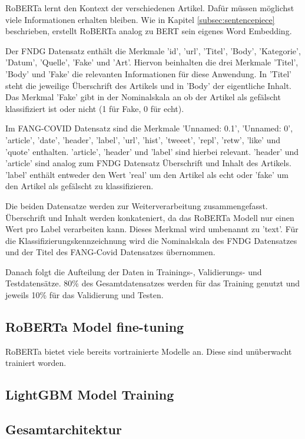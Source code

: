 RoBERTa lernt den Kontext der verschiedenen Artikel. Dafür müssen möglichst viele Informationen erhalten bleiben. 
Wie in Kapitel \ref{subsec:sentencepiece} beschrieben, erstellt RoBERTa analog zu BERT sein eigenes Word Embedding.

Der FNDG Datensatz enthält die Merkmale 'id', 'url', 'Titel', 'Body', 'Kategorie', 'Datum', 'Quelle', 'Fake' und 'Art'.
Hiervon beinhalten die drei Merkmale 'Titel', 'Body' und 'Fake' die relevanten Informationen für diese Anwendung.
In 'Titel' steht die jeweilige Überschrift des Artikels und in 'Body' der eigentliche Inhalt. Das Merkmal 'Fake' gibt in der Nominalskala
an ob der Artikel als gefälscht klassifiziert ist oder nicht (1 für Fake, 0 für echt).

Im FANG-COVID Datensatz sind die Merkmale 'Unnamed: 0.1', 'Unnamed: 0', 'article', 'date', 'header', 'label', 'url', 'hist', 'tweeet', 'repl', 'retw', 'like' und 'quote'
enthalten. 'article', 'header' und 'label' sind hierbei relevant. 'header' und 'article' sind analog zum FNDG Datensatz Überschrift und Inhalt
des Artikels. 'label' enthält entweder den Wert 'real' um den Artikel als echt oder 'fake' um den Artikel als gefälscht zu klassifizieren.

Die beiden Datensatze werden zur Weiterverarbeitung zusammengefasst. Überschrift und Inhalt werden konkateniert, da das RoBERTa Modell nur
einen Wert pro Label verarbeiten kann. Dieses Merkmal wird umbenannt zu 'text'. 
Für die Klassifizierungskennzeichnung wird die Nominalskala des FNDG Datensatzes und der Titel des FANG-Covid Datensatzes übernommen.

Danach folgt die Aufteilung der Daten in Trainings-, Validierungs- und Testdatensätze. 
80\% des Gesamtdatensatzes werden für das Training genutzt und jeweils 10\% für das Validierung und Testen.




\subsection{RoBERTa Model fine-tuning}

RoBERTa bietet viele bereits vortrainierte Modelle an. Diese sind unüberwacht trainiert worden. 


\subsection{LightGBM Model Training}

\subsection{Gesamtarchitektur}

